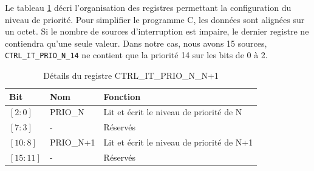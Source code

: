 Le tableau \ref{tab:reg_PRIO} décri l'organisation des registres permettant la configuration du niveau de priorité.
Pour simplifier le programme C, les données sont alignées sur un octet.
Si le nombre de sources d'interruption est impaire, le dernier registre ne contiendra qu'une seule valeur.
Dans notre cas, nous avons 15 sources, \texttt{CTRL\_IT\_PRIO\_N\_14} ne contient que la priorité 14 sur les bits de 0 à 2.
\begin{table}[H]
	\centering
	\begin{tabular}{lll}
		\toprule
		\textbf{Bit} & \textbf{Nom} & \textbf{Fonction}                         \\ \midrule
		$[2:0]$      & PRIO\_N      & Lit et écrit le niveau de priorité de N   \\
		$[7:3]$      & -            & Réservés                                  \\
		$[10:8]$     & PRIO\_N+1    & Lit et écrit le niveau de priorité de N+1 \\
		$[15:11]$    & -            & Réservés                                  \\
		\bottomrule
	\end{tabular}
	\caption{Détails du registre CTRL\_IT\_PRIO\_N\_N+1}
	\label{tab:reg_PRIO}
\end{table}


